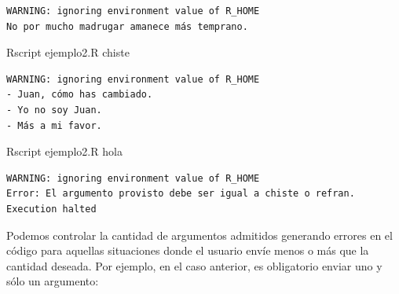 \documentclass[
]{book}
\newenvironment{Shaded}{\begin{snugshade}}{\end{snugshade}}
\newcommand{\ExtensionTok}[1]{#1}
\newcommand{\NormalTok}[1]{#1}
\begin{document}
\begin{verbatim}
WARNING: ignoring environment value of R_HOME
No por mucho madrugar amanece más temprano.
\end{verbatim}

\begin{Shaded}
\begin{Highlighting}[]
\ExtensionTok{Rscript}\NormalTok{ ejemplo2.R chiste}
\end{Highlighting}
\end{Shaded}

\begin{verbatim}
WARNING: ignoring environment value of R_HOME
- Juan, cómo has cambiado.
- Yo no soy Juan.
- Más a mi favor.
\end{verbatim}

\begin{Shaded}
\begin{Highlighting}[]
\ExtensionTok{Rscript}\NormalTok{ ejemplo2.R hola}
\end{Highlighting}
\end{Shaded}

\begin{verbatim}
WARNING: ignoring environment value of R_HOME
Error: El argumento provisto debe ser igual a chiste o refran.
Execution halted
\end{verbatim}

Podemos controlar la cantidad de argumentos admitidos generando errores en el código para aquellas situaciones donde el usuario envíe menos o más que la cantidad deseada. Por ejemplo, en el caso anterior, es obligatorio enviar uno y sólo un argumento:
\end{document}

